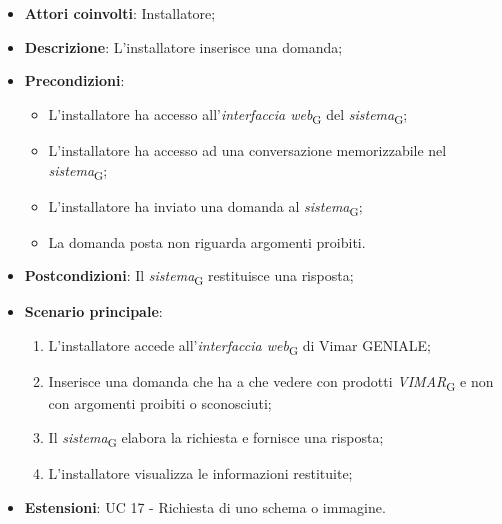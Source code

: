 \begin{itemize}
    \item \textbf{Attori coinvolti}: Installatore;
    \item \textbf{Descrizione}: L’installatore inserisce una domanda;
    \item \textbf{Precondizioni}: 
        \begin{itemize}
            \item L’installatore ha accesso all’\textit{interfaccia web}\textsubscript{G} del \textit{sistema}\textsubscript{G};
            \item L’installatore ha accesso ad una conversazione memorizzabile nel \textit{sistema}\textsubscript{G};
            \item L'installatore ha inviato una domanda al \textit{sistema}\textsubscript{G};
            \item La domanda posta non riguarda argomenti proibiti.
        \end{itemize}
    \item \textbf{Postcondizioni}: Il \textit{sistema}\textsubscript{G} restituisce una risposta;
    \item \textbf{Scenario principale}:
    \begin{enumerate}
    \item L’installatore accede all’\textit{interfaccia web}\textsubscript{G} di Vimar GENIALE;
    \item Inserisce una domanda che ha a che vedere con prodotti \textit{VIMAR}\textsubscript{G} e non con argomenti proibiti o sconosciuti;
    \item Il \textit{sistema}\textsubscript{G} elabora la richiesta e fornisce una risposta;
    \item L’installatore visualizza le informazioni restituite;
    \end{enumerate}
    \item \textbf{Estensioni}: UC 17 - Richiesta di uno schema o immagine.
\end{itemize}
